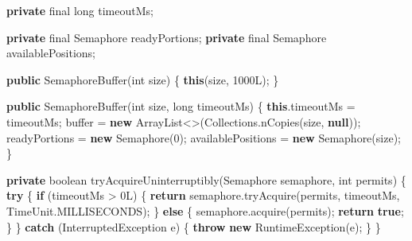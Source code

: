 \documentclass[11pt]{article}
\newenvironment{Shaded}{}{}
\newcommand{\KeywordTok}[1]{\textcolor[rgb]{0.00,0.44,0.13}{\textbf{{#1}}}}
\newcommand{\DataTypeTok}[1]{\textcolor[rgb]{0.56,0.13,0.00}{{#1}}}
\newcommand{\DecValTok}[1]{\textcolor[rgb]{0.25,0.63,0.44}{{#1}}}
\newcommand{\FunctionTok}[1]{\textcolor[rgb]{0.02,0.16,0.49}{{#1}}}
\newcommand{\NormalTok}[1]{{#1}}
\newcommand{\ControlFlowTok}[1]{\textcolor[rgb]{0.00,0.44,0.13}{\textbf{{#1}}}}
\newcommand{\OperatorTok}[1]{\textcolor[rgb]{0.40,0.40,0.40}{{#1}}}
\newcommand{\BuiltInTok}[1]{{#1}}
\begin{document}
\begin{Shaded}
\begin{Highlighting}[]
    \KeywordTok{private} \DataTypeTok{final} \DataTypeTok{long}\NormalTok{ timeoutMs}\OperatorTok{;}

    \KeywordTok{private} \DataTypeTok{final} \BuiltInTok{Semaphore}\NormalTok{ readyPortions}\OperatorTok{;}
    \KeywordTok{private} \DataTypeTok{final} \BuiltInTok{Semaphore}\NormalTok{ availablePositions}\OperatorTok{;}

    \KeywordTok{public} \FunctionTok{SemaphoreBuffer}\OperatorTok{(}\DataTypeTok{int}\NormalTok{ size}\OperatorTok{)} \OperatorTok{\{}
        \KeywordTok{this}\OperatorTok{(}\NormalTok{size}\OperatorTok{,} \DecValTok{1000L}\OperatorTok{);}
    \OperatorTok{\}}

    \KeywordTok{public} \FunctionTok{SemaphoreBuffer}\OperatorTok{(}\DataTypeTok{int}\NormalTok{ size}\OperatorTok{,} \DataTypeTok{long}\NormalTok{ timeoutMs}\OperatorTok{)} \OperatorTok{\{}
        \KeywordTok{this}\OperatorTok{.}\FunctionTok{timeoutMs} \OperatorTok{=}\NormalTok{ timeoutMs}\OperatorTok{;}
\NormalTok{        buffer }\OperatorTok{=} \KeywordTok{new} \BuiltInTok{ArrayList}\OperatorTok{\textless{}\textgreater{}(}\BuiltInTok{Collections}\OperatorTok{.}\FunctionTok{nCopies}\OperatorTok{(}\NormalTok{size}\OperatorTok{,} \KeywordTok{null}\OperatorTok{));}
\NormalTok{        readyPortions }\OperatorTok{=} \KeywordTok{new} \BuiltInTok{Semaphore}\OperatorTok{(}\DecValTok{0}\OperatorTok{);}
\NormalTok{        availablePositions }\OperatorTok{=} \KeywordTok{new} \BuiltInTok{Semaphore}\OperatorTok{(}\NormalTok{size}\OperatorTok{);}
    \OperatorTok{\}}

    \KeywordTok{private} \DataTypeTok{boolean} \FunctionTok{tryAcquireUninterruptibly}\OperatorTok{(}\BuiltInTok{Semaphore}\NormalTok{ semaphore}\OperatorTok{,} \DataTypeTok{int}\NormalTok{ permits}\OperatorTok{)} \OperatorTok{\{}
        \ControlFlowTok{try} \OperatorTok{\{}
            \ControlFlowTok{if} \OperatorTok{(}\NormalTok{timeoutMs }\OperatorTok{\textgreater{}} \DecValTok{0L}\OperatorTok{)} \OperatorTok{\{}
                \ControlFlowTok{return}\NormalTok{ semaphore}\OperatorTok{.}\FunctionTok{tryAcquire}\OperatorTok{(}\NormalTok{permits}\OperatorTok{,}\NormalTok{ timeoutMs}\OperatorTok{,} \BuiltInTok{TimeUnit}\OperatorTok{.}\FunctionTok{MILLISECONDS}\OperatorTok{);}
            \OperatorTok{\}} \ControlFlowTok{else} \OperatorTok{\{}
\NormalTok{                semaphore}\OperatorTok{.}\FunctionTok{acquire}\OperatorTok{(}\NormalTok{permits}\OperatorTok{);}
                \ControlFlowTok{return} \KeywordTok{true}\OperatorTok{;}
            \OperatorTok{\}}
        \OperatorTok{\}} \ControlFlowTok{catch} \OperatorTok{(}\BuiltInTok{InterruptedException}\NormalTok{ e}\OperatorTok{)} \OperatorTok{\{}
            \ControlFlowTok{throw} \KeywordTok{new} \BuiltInTok{RuntimeException}\OperatorTok{(}\NormalTok{e}\OperatorTok{);}
        \OperatorTok{\}}
    \OperatorTok{\}}


\end{Highlighting}
\end{Shaded}
\end{document}
